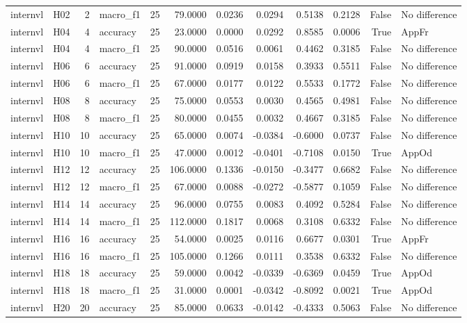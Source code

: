 \begin{table}[tbp]
\begin{tabular}{llrlrrrrrrrl}
internvl & H02 & 2 & macro\_f1 & 25 & 79.0000 & 0.0236 & 0.0294 & 0.5138 & 0.2128 & False & No difference \\
internvl & H04 & 4 & accuracy & 25 & 23.0000 & 0.0000 & 0.0292 & 0.8585 & 0.0006 & True & AppFr \\
internvl & H04 & 4 & macro\_f1 & 25 & 90.0000 & 0.0516 & 0.0061 & 0.4462 & 0.3185 & False & No difference \\
internvl & H06 & 6 & accuracy & 25 & 91.0000 & 0.0919 & 0.0158 & 0.3933 & 0.5511 & False & No difference \\
internvl & H06 & 6 & macro\_f1 & 25 & 67.0000 & 0.0177 & 0.0122 & 0.5533 & 0.1772 & False & No difference \\
internvl & H08 & 8 & accuracy & 25 & 75.0000 & 0.0553 & 0.0030 & 0.4565 & 0.4981 & False & No difference \\
internvl & H08 & 8 & macro\_f1 & 25 & 80.0000 & 0.0455 & 0.0032 & 0.4667 & 0.3185 & False & No difference \\
internvl & H10 & 10 & accuracy & 25 & 65.0000 & 0.0074 & -0.0384 & -0.6000 & 0.0737 & False & No difference \\
internvl & H10 & 10 & macro\_f1 & 25 & 47.0000 & 0.0012 & -0.0401 & -0.7108 & 0.0150 & True & AppOd \\
internvl & H12 & 12 & accuracy & 25 & 106.0000 & 0.1336 & -0.0150 & -0.3477 & 0.6682 & False & No difference \\
internvl & H12 & 12 & macro\_f1 & 25 & 67.0000 & 0.0088 & -0.0272 & -0.5877 & 0.1059 & False & No difference \\
internvl & H14 & 14 & accuracy & 25 & 96.0000 & 0.0755 & 0.0083 & 0.4092 & 0.5284 & False & No difference \\
internvl & H14 & 14 & macro\_f1 & 25 & 112.0000 & 0.1817 & 0.0068 & 0.3108 & 0.6332 & False & No difference \\
internvl & H16 & 16 & accuracy & 25 & 54.0000 & 0.0025 & 0.0116 & 0.6677 & 0.0301 & True & AppFr \\
internvl & H16 & 16 & macro\_f1 & 25 & 105.0000 & 0.1266 & 0.0111 & 0.3538 & 0.6332 & False & No difference \\
internvl & H18 & 18 & accuracy & 25 & 59.0000 & 0.0042 & -0.0339 & -0.6369 & 0.0459 & True & AppOd \\
internvl & H18 & 18 & macro\_f1 & 25 & 31.0000 & 0.0001 & -0.0342 & -0.8092 & 0.0021 & True & AppOd \\
internvl & H20 & 20 & accuracy & 25 & 85.0000 & 0.0633 & -0.0142 & -0.4333 & 0.5063 & False & No difference \\

\end{tabular}
\end{table}
